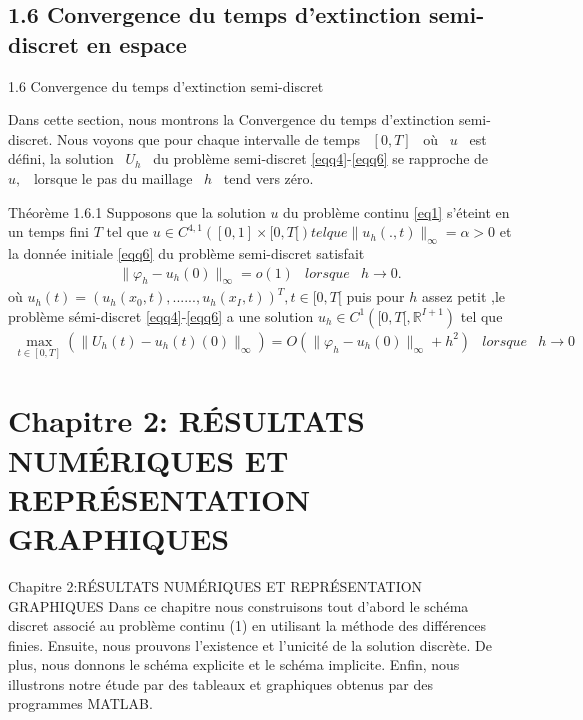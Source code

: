 \documentclass[10pt]{beamer}
\begin{document}
 
 \begin{frame}
   \subsection{1.6 Convergence du temps d'extinction semi-discret en espace}
   \begin{block}{1.6 Convergence du temps d'extinction semi-discret}\end{block}
     Dans cette section, nous montrons la Convergence du temps d'extinction semi-discret. Nous voyons que pour chaque intervalle de temps \ $[0,T]$ \ où \ $u$ \ est défini, la solution \ $U_h$ \  du problème  semi-discret \eqref{eqq4}-\eqref{eqq6} se rapproche de 
\ $u,$ \ lorsque le pas du maillage \ $h$ \ tend vers zéro.\\
\begin{block}{Théorème 1.6.1}
Supposons que la solution $u$ du problème continu \eqref{eq1} s'éteint   en un temps fini $ T $ tel que $ u \in C^{4,1}([0,1] \times[0,T[) tel que \| u_{h}(.,t)  \| _{\infty}=\alpha >0 $ et la donnée initiale \eqref{eqq6} du problème semi-discret satisfait
\begin{eqnarray}  
\| \varphi_{h}- u_{h}(0)  \| _{\infty}=o(1) & lorsque & h \longrightarrow 0.\label{eq18}
\end{eqnarray}
où $u_{h}(t)=\left( u_{h}(x_{0},t),......,u_{h}(x_{I},t)\right)^{T}, t \in [0,T[$ puis pour $h$ assez petit ,le problème sémi-discret \eqref{eqq4}-\eqref{eqq6} a une solution $u_h \in  C^1\left([0,T[,\mathbb{R}^{I+1}\right)$ tel que 
\begin{eqnarray*}
\max_{t \in [0,T]}\left(\| U_{h}(t)- u_{h}(t)(0)  \| _{\infty}\right)=O\left(\| \varphi_{h}- u_{h}(0)  \| _{\infty}+ h^{2}\right)& lorsque & h \longrightarrow 0
\end{eqnarray*}
	
 \end{block}

  \end{frame}
   
\section{Chapitre 2: RÉSULTATS NUMÉRIQUES ET REPRÉSENTATION GRAPHIQUES}
\begin{frame}{Chapitre 2:RÉSULTATS NUMÉRIQUES ET REPRÉSENTATION GRAPHIQUES }
Dans ce chapitre nous construisons tout d'abord le schéma discret associé au problème continu (1) en utilisant la méthode des différences finies. Ensuite, nous prouvons l'existence et l'unicité de la solution discrète. De plus, nous donnons le schéma explicite et le schéma implicite.  Enfin, nous illustrons notre étude par des tableaux et graphiques obtenus par des programmes MATLAB.

\end{frame}
\end{document}
